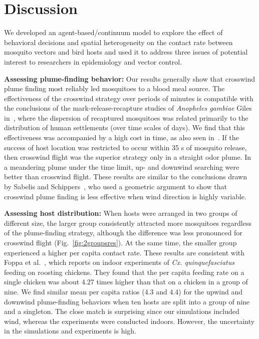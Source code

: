 \documentclass[10pt]{article}
\newif\ifnotesw
\newcommand{\notes}[1]{\ifnotesw  $\bullet$\ \textit{ \textbf{#1}}\ $\bullet$ \fi}
\begin{document}
\section*{Discussion}\label{sec:summary}
	 	We developed an agent-based/continuum model
to explore the effect of behavioral decisions and spatial heterogeneity on the contact
rate between mosquito vectors and bird hosts and used it to address three issues of potential interest to researchers in epidemiology and vector control. 


\textbf{Assessing plume-finding behavior: }
Our results generally show that crosswind plume finding most reliably led mosquitoes to a blood meal source. The effectiveness of the crosswind strategy over periods of minutes is compatible with the conclusions of the mark-release-recapture studies of  \textit{Anopheles gambiae} Giles in~\cite{Gillies1961}, where the dispersion of recaptured mosquitoes was related primarily to the distribution of human settlements (over time scales of days). We find that this effectiveness was accompanied by a high cost in time, as also seen in~\cite{Pasternak2009}. If the success of host location was restricted to occur within 35 s of mosquito release, then crosswind flight was the superior strategy only in a straight odor plume. In a meandering plume under the time limit, up- and downwind searching were better than crosswind flight. These results are similar to the conclusions drawn by Sabelis and Schippers~\cite{Sabelis1984}, who used a geometric argument to show that crosswind plume finding is less effective when wind direction is highly variable. 

%

\textbf{Assessing host distribution:} When hosts were arranged in two groups of different
size, the larger group consistently attracted more mosquitoes
regardless of the plume-finding strategy, although the difference
was less pronounced for crosswind flight (Fig.~\ref{fig:2groupsres}).  At the same time, the smaller group experienced a higher per capita contact rate.
These results are consistent with Foppa et al.~\cite{Foppa2011}, which reports on indoor experiments of \textit{Cx. quinquefasciatus} feeding on roosting chickens. They found that the per capita feeding rate on a single chicken was about 4.27 times higher than that on a chicken in a group of nine. We find similar mean per capita ratios (4.3 and 4.4) for the upwind and downwind plume-finding behaviors when ten hosts are split into a group of nine and a singleton. The close match is surprising since our simulations included wind, whereas the experiments were conducted indoors. However, the uncertainty in the simulations and experiments is high.
\end{document}
